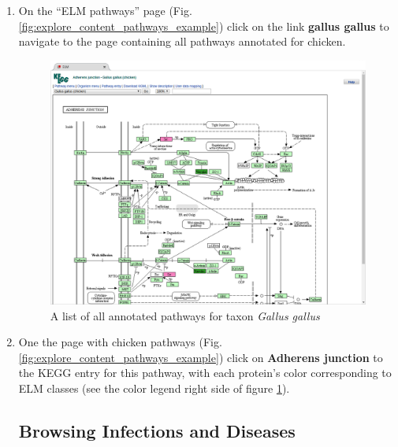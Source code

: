 \documentclass[12pt]{article}
\newcommand\button[1]{%
	\textbf{#1}%
}
\begin{document}
\begin{enumerate}
\item On the ``ELM pathways'' page
	(Fig.  \ref{fig:explore_content_pathways_example})
	click on the link \button{gallus gallus} to navigate to the page
	containing all pathways annotated for
	chicken.

\begin{figure}[h!]
	\centering
	\includegraphics[width=\textwidth]{Figures/explore_content/pathways_kegg.png} 
	\caption{
	A list of all annotated pathways for taxon \textit{Gallus gallus}
	}
	\label{fig:explore_content_pathways_kegg}
\end{figure}

\item One the page with chicken pathways
	(Fig. \ref{fig:explore_content_pathways_example})
	click on \button{Adherens junction} to the KEGG entry for this pathway,
	with each protein's color corresponding to ELM classes (see the color
	legend right side of figure \ref{fig:explore_content_pathways_kegg}).

%
%
\subsection*{Browsing Infections and Diseases}
\label{subsec:explore_content_infections_and_diseases}


\end{enumerate}
\end{document}
